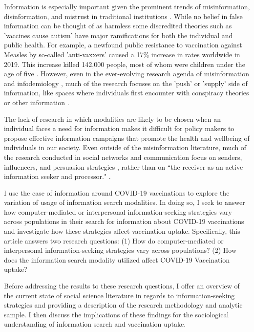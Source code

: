 Information is especially important given the prominent trends of
misinformation, disinformation, and mistrust in traditional institutions
\citep{starbird19, kata10}. While no belief in false information can be thought of as
harmless \citep{douglas21} some discredited theories such as 'vaccines cause autism'
have major ramifications for both the individual and public health.
For example, a newfound public resistance to vaccination
against Measles by so-called 'anti-vaxxers' caused a 17\% increase in rates
worldwide in 2019. This increase killed  142,000 people, most of whom were
children under the age of five \citep{givetash19}. However, even in the ever-evolving
research agenda of misinformation and infodemiology \citep{eysenbach02}, much of the
research focuses on the 'push' or 'supply' side of information, like spaces where
individuals first encounter with conspiracy theories or other information
\citep{johnsonOnlineCompetitionPro2020, broniatowski_etal20}.

The lack of research in which modalities are likely to be chosen when an
individual faces a need for information makes it difficult for policy makers to
propose effective information campaigns that promote the health and wellbeing of
individuals in our society. Even outside of the misinformation literature, much
of the research conducted in social networks and communication focus on senders,
influencers, and persuasion strategies 
\citep{mertonManifestLatentFunctions1968, katzPersonalInfluencePart1955, lazarsfeldPeopleChoice1944},
rather than on “the receiver as an active information seeker and processor." 
\citep{johnsonComprehensiveModelCancerRelated1993}
\citep[for an exception, see]{eysenbach09}.

I use the case of information around COVID-19 vaccinations to explore the
variation of usage of information search modalities. In doing so, I seek to answer
how computer-mediated or interpersonal information-seeking strategies vary
across populations in their search for information about COVID-19 vaccinations
and investigate how these strategies affect vaccination uptake. Specifically, this article 
answers two research questions: (1) How do computer-mediated or interpersonal information-seeking
strategies vary across populations? (2) How does the information search modality utilized 
affect COVID-19 Vaccination uptake? 

Before addressing the results to these research questions, I offer an overview of the
current state of social science literature in regards to information-seeking
strategies and providing a description of the research methodology and
analytic sample. I then discuss the implications of these findings for the
sociological understanding of information search and vaccination uptake.

